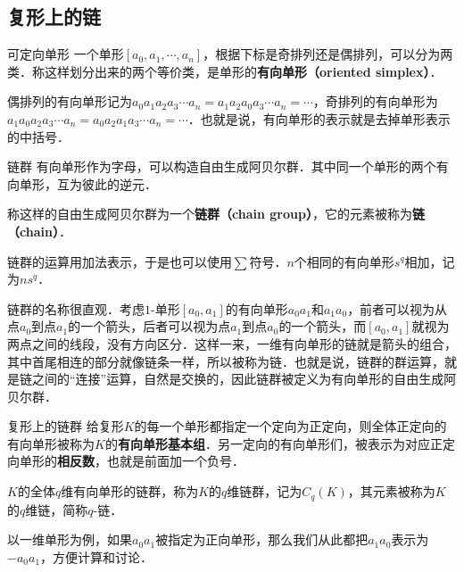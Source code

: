 



\subsection{复形上的链}

\begin{definition}{可定向单形}
一个单形$[a_0, a_1, \cdots, a_n]$，根据下标是奇排列还是偶排列，可以分为两类．称这样划分出来的两个等价类，是单形的\textbf{有向单形（oriented simplex）}．

偶排列的有向单形记为$a_0a_1a_2a_3\cdots a_n=a_1a_2a_0a_3\cdots a_n=\cdots$，奇排列的有向单形为$a_1a_0a_2a_3\cdots a_n=a_0a_2a_1a_3\cdots a_n=\cdots$．也就是说，有向单形的表示就是去掉单形表示的中括号．
\end{definition}

\begin{definition}{链群}
有向单形作为字母，可以构造自由生成阿贝尔群．其中同一个单形的两个有向单形，互为彼此的逆元．

称这样的自由生成阿贝尔群为一个\textbf{链群（chain group）}，它的元素被称为\textbf{链（chain）}．

链群的运算用加法表示，于是也可以使用$\sum$符号．$n$个相同的有向单形$s^q$相加，记为$ns^q$．
\end{definition}

链群的名称很直观．考虑$1$-单形$[a_0, a_1]$的有向单形$a_0a_1$和$a_1a_0$，前者可以视为从点$a_0$到点$a_1$的一个箭头，后者可以视为点$a_1$到点$a_0$的一个箭头，而$[a_0, a_1]$就视为两点之间的线段，没有方向区分．这样一来，一维有向单形的链就是箭头的组合，其中首尾相连的部分就像链条一样，所以被称为链．也就是说，链群的群运算，就是链之间的“连接”运算，自然是交换的，因此链群被定义为有向单形的自由生成阿贝尔群．

\begin{definition}{复形上的链群}
给复形$K$的每一个单形都指定一个定向为正定向，则全体正定向的有向单形被称为$K$的\textbf{有向单形基本组}．另一定向的有向单形们，被表示为对应正定向单形的\textbf{相反数}，也就是前面加一个负号．

$K$的全体$q$维有向单形的链群，称为$K$的$q$维链群，记为$C_q(K)$，其元素被称为$K$的$q$维链，简称$q$-链．
\end{definition}

以一维单形为例，如果$a_0a_1$被指定为正向单形，那么我们从此都把$a_1a_0$表示为$-a_0a_1$，方便计算和讨论．

